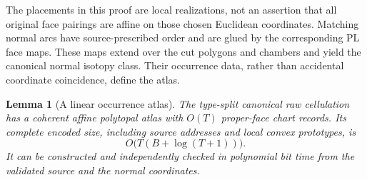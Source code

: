 \documentclass[11pt]{article}
\newtheorem{lemma}[theorem]{Lemma}
\theoremstyle{definition}\newtheorem{definition}[theorem]{Definition}
\theoremstyle{remark}\newtheorem{remark}[theorem]{Remark}
\begin{document}
The placements in this proof are local realizations, not an assertion that all original face pairings are affine on those chosen Euclidean coordinates. Matching normal arcs have source-prescribed order and are glued by the corresponding PL face maps. These maps extend over the cut polygons and chambers and yield the canonical normal isotopy class. Their occurrence data, rather than accidental coordinate coincidence, define the atlas.

\begin{lemma}[A linear occurrence atlas]\label{lem:native-atlas}
The type-split canonical raw cellulation has a coherent affine polytopal atlas with \(O(T)\) proper-face chart records. Its complete encoded size, including source addresses and local convex prototypes, is
\[
                         O\bigl(T(B+\log(T+1))\bigr).
\]
It can be constructed and independently checked in polynomial bit time from the validated source and the normal coordinates.
\end{lemma}
\end{document}

